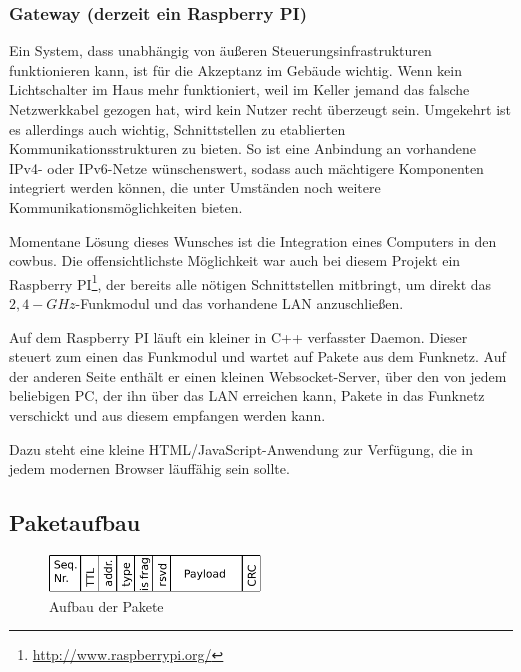 \documentclass{IEEEtran}
\begin{document}
        \subsubsection{Gateway (derzeit ein Raspberry PI)}
            Ein System, dass unabhängig von äußeren Steuerungsinfrastrukturen
            funktionieren kann, ist für die Akzeptanz im Gebäude wichtig.
            Wenn kein Lichtschalter im Haus mehr funktioniert, weil
            im Keller jemand das falsche Netzwerkkabel gezogen hat,
            wird kein Nutzer recht überzeugt sein.
            Umgekehrt ist es allerdings auch wichtig, Schnittstellen zu
            etablierten Kommunikationsstrukturen zu bieten.
            So ist eine Anbindung an vorhandene IPv4- oder IPv6-Netze
            wünschenswert, sodass auch mächtigere Komponenten integriert werden
            können, die unter Umständen noch weitere Kommunikationsmöglichkeiten
            bieten.

            Momentane Lösung dieses Wunsches ist die Integration eines Computers
            in den cowbus. Die offensichtlichste Möglichkeit war auch bei diesem
            Projekt ein Raspberry PI\footnote{\url{http://www.raspberrypi.org/}},
            der bereits alle nötigen Schnittstellen mitbringt, um direkt das
            $2,4-GHz$-Funkmodul und das vorhandene \ac{LAN} anzuschließen.

            Auf dem Raspberry PI läuft ein kleiner in C++ verfasster Daemon.
            Dieser steuert zum einen das Funkmodul und wartet auf Pakete aus
            dem Funknetz.
            Auf der anderen Seite enthält er einen kleinen Websocket-Server,
            über den von jedem beliebigen PC, der ihn über das \ac{LAN}
            erreichen kann, Pakete in das Funknetz verschickt und aus diesem
            empfangen werden kann.

            Dazu steht eine kleine HTML/JavaScript-Anwendung zur Verfügung,
            die in jedem modernen Browser läuffähig sein sollte.

    \subsection{Paketaufbau}
            \begin{figure}
            \centering
            \includegraphics[width=0.5\textwidth]{img/paket}
            \caption{Aufbau der Pakete}
            \label{fig:paket}
        \end{figure}
\end{document}
